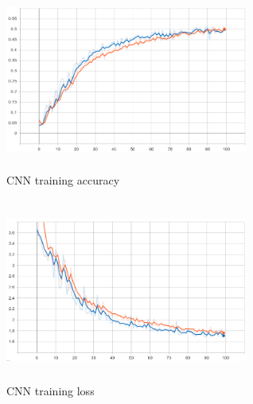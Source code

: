 \begin{figure}[h]
			\centering
	    	\includegraphics[width=8cm, height=6cm]{debug_tuy_acc}
	    	\caption{CNN training accuracy}
	    	\label{fig:CNN_accuracy}
\end{figure} 

\begin{figure}[h]
			\centering
	    	\includegraphics[width=8cm, height=6cm]{debug_tuy_loss}
	    	\caption{CNN training loss}
	    	\label{fig:CNN_loss}
\end{figure} 



